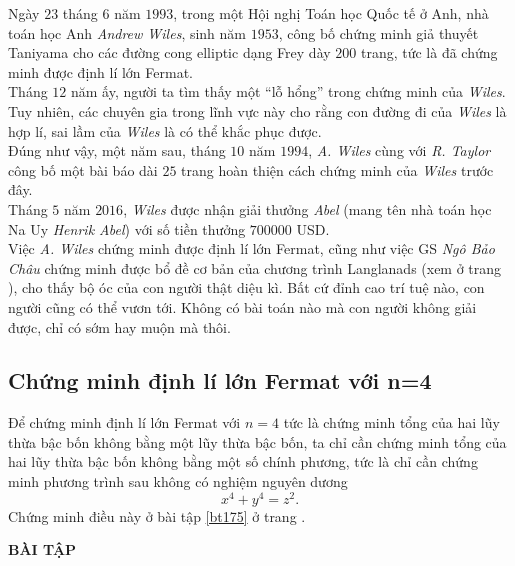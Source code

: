 Ngày $23$ tháng $6$ năm $1993$, trong một Hội nghị Toán học Quốc tế ở Anh, nhà toán học Anh \textit{Andrew Wiles}, sinh năm $1953$, công bố chứng minh giả thuyết Taniyama cho các đường cong elliptic dạng Frey dày $200$ trang, tức là đã chứng minh được định lí lớn Fermat.\\
Tháng $12$ năm ấy, người ta tìm thấy một ``lỗ hổng'' trong chứng minh của \textit{Wiles}. Tuy nhiên, các chuyên gia trong lĩnh vực này cho rằng con đường đi của \textit{Wiles} là hợp lí, sai lầm của \textit{Wiles} là có thể khắc phục được.\\
Đúng như vậy, một năm sau, tháng $10$ năm $1994$, \textit{A. Wiles} cùng với \textit{R. Taylor} công bố một bài báo dài $25$ trang hoàn thiện cách chứng minh của \textit{Wiles} trước đây.\\
Tháng $5$ năm $2016$, \textit{Wiles} được nhận giải thưởng \textit{Abel} (mang tên nhà toán học Na Uy \textit{Henrik Abel}) với số tiền thưởng $700000$ USD.\\
Việc \textit{A. Wiles} chứng minh được định lí lớn Fermat, cũng như việc GS \textit{Ngô Bảo Châu} chứng minh được bổ đề cơ bản của chương trình Langlanads (xem ở trang \pageref{dotpha}), cho thấy bộ óc của con người thật diệu kì. Bất cứ đỉnh cao trí tuệ nào, con người cũng có thể vươn tới. Không có bài toán nào mà con người không giải được, chỉ có sớm hay muộn mà thôi.
\subsection{Chứng minh định lí lớn Fermat với n=4}
Để chứng minh định lí lớn Fermat với $n=4$ tức là chứng minh tổng của hai lũy thừa bậc bốn không bằng một lũy thừa bậc bốn, ta chỉ cần chứng minh tổng của hai lũy thừa bậc bốn không bằng một số chính phương, tức là chỉ cần chứng minh phương trình sau không có nghiệm nguyên dương $$x^4+y^4=z^2.$$
Chứng minh điều này ở bài tập \ref{bt175} ở trang \pageref{bt175}.
\begin{center}
    \textbf{BÀI TẬP}
\end{center}

